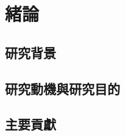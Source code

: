 \chapter{緒論}
\label{chapter:intro}
\section{研究背景}

\section{研究動機與研究目的}
\cite{Yang_2016}
\section{主要貢獻}